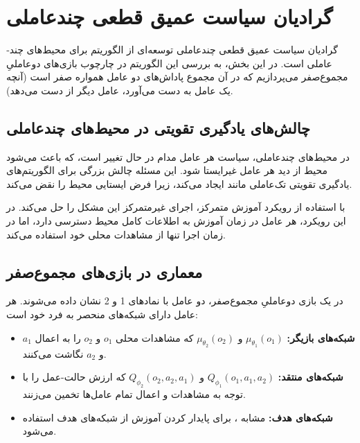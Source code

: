 \section{ گرادیان سیاست عمیق قطعی 
چند­عاملی
}\label{sec:marl_maddpg}

گرادیان سیاست عمیق قطعی چند­عاملی
توسعه‌ای از الگوریتم  برای محیط‌های چند­عاملی است. در این بخش، به بررسی این الگوریتم در چارچوب بازی‌های دو­عاملیِ مجموع­‌صفر می‌پردازیم که در آن مجموع پاداش‌های دو عامل همواره صفر است (آنچه یک عامل به دست می‌آورد، عامل دیگر از دست می‌دهد).

\subsection{چالش‌های یادگیری تقویتی در محیط‌های چند­عاملی}

در محیط‌های چند­عاملی، سیاست هر عامل مدام در حال تغییر است، که باعث می‌شود محیط از دید هر عامل غیرایستا شود. این مسئله چالش بزرگی برای الگوریتم‌های یادگیری تقویتی تک‌عاملی مانند  ایجاد می‌کند، زیرا فرض ایستایی محیط را نقض می‌کند.

 با استفاده از رویکرد آموزش متمرکز، اجرای غیرمتمرکز این مشکل را حل می‌کند. در این رویکرد، هر عامل در زمان آموزش به اطلاعات کامل محیط دسترسی دارد، اما در زمان اجرا تنها از مشاهدات محلی خود استفاده می‌کند.

\subsection{معماری  در بازی‌های مجموع­‌صفر}

در یک بازی دو­عاملیِ مجموع­‌صفر، دو عامل با نمادهای 1 و 2 نشان داده می‌شوند. هر عامل دارای شبکه‌های منحصر به فرد خود است:

\begin{itemize}
    \item \textbf{شبکه‌های بازیگر:} $\mu_{\theta_1}(o_1)$ و $\mu_{\theta_2}(o_2)$ که مشاهدات محلی $o_1$ و $o_2$ را به اعمال $a_1$ و $a_2$ نگاشت می‌کنند.
    \item \textbf{شبکه‌های منتقد:} $Q_{\phi_1}(o_1, a_1, a_2)$ و $Q_{\phi_2}(o_2, a_2, a_1)$ که ارزش حالت-عمل را با توجه به مشاهدات و اعمال تمام عامل‌ها تخمین می‌زنند.
    \item \textbf{شبکه‌های هدف:} مشابه ، برای پایدار کردن آموزش از شبکه‌های هدف استفاده می‌شود.
\end{itemize}

